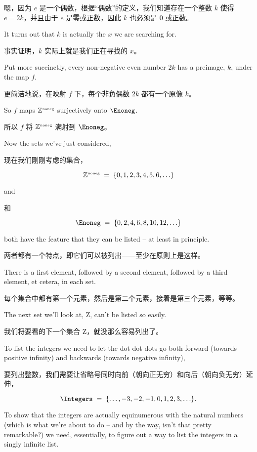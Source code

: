 嗯，因为 $e$ 是一个偶数，根据“偶数”的定义，我们知道存在一个整数 $k$ 使得 $e = 2k$，并且由于 $e$ 是零或正数，因此 $k$ 也必须是 $0$ 或正数。

It turns out that $k$ is actually the $x$ we
are searching for.

事实证明，$k$ 实际上就是我们正在寻找的 $x$。

Put more
succinctly, every non-negative even number $2k$ has a preimage, $k$, under the
map $f$.

更简洁地说，在映射 $f$ 下，每个非负偶数 $2k$ 都有一个原像 $k$。

So $f$ maps ${\mathbb Z}^{\mbox{\tiny noneg}}$ surjectively onto $\Enoneg$.

所以 $f$ 将 ${\mathbb Z}^{\mbox{\tiny noneg}}$ 满射到 $\Enoneg$。

Now the sets we've just considered,

现在我们刚刚考虑的集合，

\[ {\mathbb Z}^{\mbox{\tiny noneg}} \; = \;
    \{0, 1, 2, 3, 4, 5, 6, \ldots \} \]

\noindent and

\noindent 和

\[ \Enoneg \; = \;
    \{0, 2, 4, 6, 8, 10, 12, \ldots \} \]

\noindent both have the feature that they can be listed -- at
least in principle.

\noindent 两者都有一个特点，即它们可以被列出——至少在原则上是这样。

There is a first element, followed by a
second element, followed by a third element,
et cetera, in each set.

每个集合中都有第一个元素，然后是第二个元素，接着是第三个元素，等等。

The next set we'll look at, Z, can't be listed so easily.

我们将要看的下一个集合 Z，就没那么容易列出了。

To list the integers we need to let the dot-dot-dots go both forward (towards
positive infinity) and backwards (towards negative infinity),

要列出整数，我们需要让省略号同时向前（朝向正无穷）和向后（朝向负无穷）延伸，

\[ \Integers \;
    = \; \{ \ldots , -3, -2, -1, 0, 1, 2, 3, \ldots \}.
\]

\noindent To show that the integers are actually equinumerous with the natural
numbers (which is what we're about to do -- and by the way, isn't that pretty
remarkable?) we need, essentially, to figure out a way to list the integers in
a singly infinite list.

